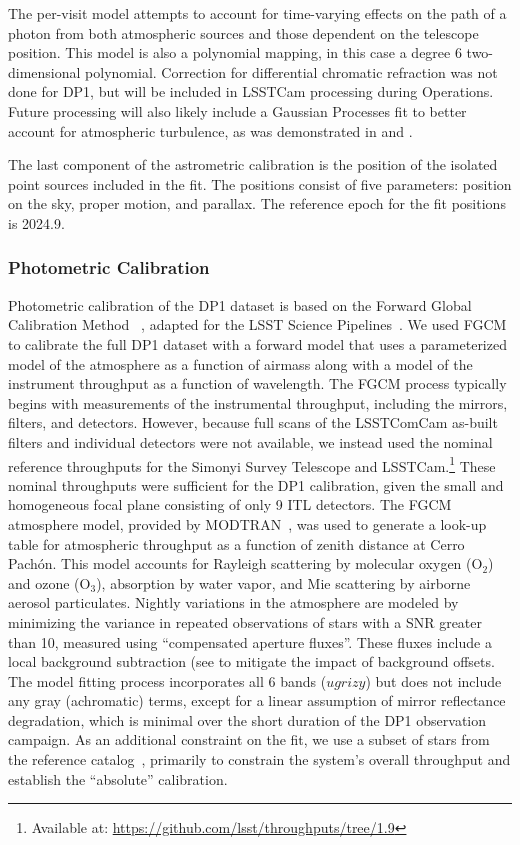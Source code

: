 The per-visit model attempts to account for time-varying effects on the path of a photon from both atmospheric sources and those dependent on the telescope position.
This model is also a polynomial mapping, in this case a degree 6 two-dimensional polynomial.
Correction for differential chromatic refraction was not done for DP1, but will be included in LSSTCam processing during Operations.
Future processing will also likely include a Gaussian Processes fit to better account for atmospheric turbulence, as was demonstrated in \citet{Fortino2021} and \citet{Leget2021}.

The last component of the astrometric calibration is the position of the isolated point sources included in the fit. 
The positions consist of five parameters: position on the sky, proper motion, and parallax.
The reference epoch for the fit positions is 2024.9. 

\subsubsection{Photometric Calibration}
\label{photometric_calibration}
Photometric calibration of the DP1 dataset is based on the Forward Global Calibration Method
~\citep[FGCM][]{2018AJ....155...41B}, adapted for the LSST Science Pipelines~\citep{2022PASJ...74..247A, SITCOMTN-086}.
We used FGCM to calibrate the full DP1 dataset with a forward model that uses a parameterized model of the atmosphere as a function of airmass along with a model of the instrument throughput as a function of wavelength.
The \gls{FGCM} process typically begins with measurements of the instrumental throughput, including the mirrors, filters, and detectors. 
However, because full scans of the LSSTComCam as-built filters and individual detectors were not available, we instead used the nominal reference throughputs for the Simonyi Survey Telescope and LSSTCam.\footnote{Available at: \url{https://github.com/lsst/throughputs/tree/1.9}}
These nominal throughputs were sufficient for the DP1 calibration, given the small and homogeneous focal plane consisting of only 9 ITL detectors.
The FGCM atmosphere model, provided by MODTRAN~\citep{1999SPIE.3756..348B}, was used to generate a look-up table for atmospheric throughput as a function of zenith distance at Cerro Pachón. 
This model accounts for Rayleigh scattering by molecular oxygen ($\mathrm{O}_2$) and ozone ($\mathrm{O}_3$), absorption by water vapor, and Mie scattering by airborne aerosol particulates.
Nightly variations in the atmosphere are modeled by minimizing the variance in repeated observations of stars with a \gls{SNR} greater than 10, measured using ``compensated aperture fluxes''. 
These fluxes include a local background subtraction (see  to mitigate the impact of background offsets. 
The model fitting process incorporates all 6 bands ($ugrizy$) but does not include any gray (achromatic) terms, except for a linear assumption of mirror reflectance degradation, which is minimal over the short duration of the DP1 observation campaign.
As an additional constraint on the fit, we use a subset of stars from the reference catalog~\citep{DMTN-277}, primarily to constrain the system's overall throughput and establish the ``absolute'' calibration.

